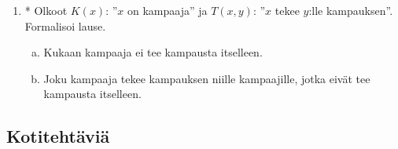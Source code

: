\begin{enumerate}
\item * %
Olkoot $K(x)$: ''$x$ on kampaaja'' ja
$T(x, y)$: ''$x$ tekee $y$:lle kampauksen''. Formalisoi lause.
\begin{enumerate}[a)]
\item Kukaan kampaaja ei tee kampausta itselleen.
\item Joku kampaaja tekee kampauksen niille kampaajille,
jotka eivät tee kampausta itselleen.
\end{enumerate}

\end{enumerate}

\subsection*{Kotitehtäviä}

